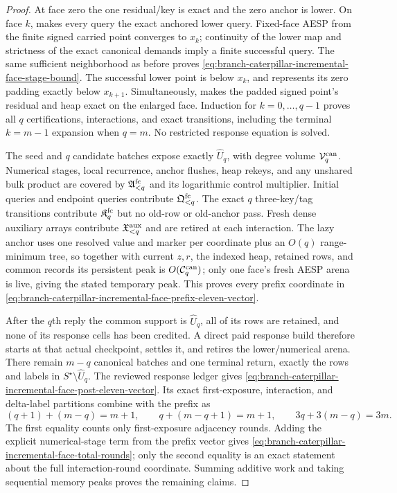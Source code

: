 \begin{proof}
At face zero the one residual/key is exact and the zero anchor is lower.  On
face $k$,  makes every query
the exact anchored lower query.  Fixed-face AESP from the finite signed
carried point converges to $x_k$; continuity of the lower map and strictness
of the exact canonical demands imply a finite successful query.  The same
sufficient neighborhood as before proves
\cref{eq:branch-caterpillar-incremental-face-stage-bound}.  The successful
lower point is below $x_k$, and
 represents its zero padding exactly
below $x_{k+1}$.  Simultaneously,
 makes the padded
signed point's residual and heap exact on the enlarged face.  Induction for
$k=0,\ldots,q-1$ proves all $q$ certifications, interactions, and exact
transitions, including the terminal $k=m-1$ expansion when $q=m$.  No
restricted response equation is solved.

The seed and $q$ candidate batches expose exactly $\widehat U_q$, with degree
volume $\mathcal V_q^{\rm can}$.  Numerical stages, local recurrence, anchor
flushes, heap rekeys, and any unshared bulk product are covered by
$\mathfrak A_{<q}^{\rm fc}$ and its logarithmic control multiplier.  Initial
queries and endpoint queries contribute $\mathfrak Q_{<q}^{\rm fc}$.
The exact $q$ three-key/tag transitions contribute
$\mathfrak K_q^{\rm fc}$ but no old-row or old-anchor pass.  Fresh dense
auxiliary arrays contribute $\mathfrak X_{<q}^{\rm aux}$ and are retired at
each interaction.  The lazy anchor uses one resolved value and marker per
coordinate plus an $O(q)$ range-minimum tree, so together with current
$z,r$, the indexed heap, retained rows, and common records its persistent
peak is $O(\mathcal C_q^{\rm can})$; only one face's fresh AESP arena is live,
giving the stated temporary peak.  This proves every prefix coordinate in
\cref{eq:branch-caterpillar-incremental-face-prefix-eleven-vector}.

After the $q$th reply the common support is $\widehat U_q$, all of its rows
are retained, and none of its response cells has been credited.  A direct
paid response build therefore starts at that actual checkpoint, settles it,
and retires the lower/numerical arena.  There remain $m-q$ canonical batches
and one terminal return, exactly the rows and labels in
$S^\star\setminus\widehat U_q$.  The reviewed response ledger gives
\cref{eq:branch-caterpillar-incremental-face-post-eleven-vector}.  Its exact
first-exposure, interaction, and delta-label partitions combine with the
prefix as
\[
 (q+1)+(m-q)=m+1,
 \qquad q+(m-q+1)=m+1,
 \qquad 3q+3(m-q)=3m.
\]
The first equality counts only first-exposure adjacency rounds.  Adding the
explicit numerical-stage term from the prefix vector gives
\cref{eq:branch-caterpillar-incremental-face-total-rounds}; only the second
equality is an exact statement about the full interaction-round coordinate.
Summing additive work and taking sequential memory peaks proves the remaining
claims.
\end{proof}
